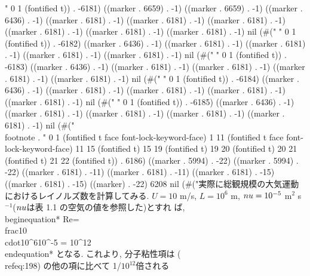 " 0 1 (fontified t)) . -6181) ((marker . 6659) . -1) ((marker . 6659) . -1) ((marker . 6436) . -1) ((marker . 6181) . -1) ((marker . 6181) . -1) ((marker . 6181) . -1) ((marker . 6181) . -1) ((marker . 6181) . -1) ((marker . 6181) . -1) nil (#("	" 0 1 (fontified t)) . -6182) ((marker . 6436) . -1) ((marker . 6181) . -1) ((marker . 6181) . -1) ((marker . 6181) . -1) ((marker . 6181) . -1) nil (#(" " 0 1 (fontified t)) . -6183) ((marker . 6436) . -1) ((marker . 6181) . -1) ((marker . 6181) . -1) ((marker . 6181) . -1) ((marker . 6181) . -1) nil (#(" " 0 1 (fontified t)) . -6184) ((marker . 6436) . -1) ((marker . 6181) . -1) ((marker . 6181) . -1) ((marker . 6181) . -1) ((marker . 6181) . -1) nil (#(" " 0 1 (fontified t)) . -6185) ((marker . 6436) . -1) ((marker . 6181) . -1) ((marker . 6181) . -1) ((marker . 6181) . -1) ((marker . 6181) . -1) nil (#("\\footnote{
	   		  }.
" 0 1 (fontified t face font-lock-keyword-face) 1 11 (fontified t face font-lock-keyword-face) 11 15 (fontified t) 15 19 (fontified t) 19 20 (fontified t) 20 21 (fontified t) 21 22 (fontified t)) . 6186) ((marker . 5994) . -22) ((marker . 5994) . -22) ((marker . 6181) . -11) ((marker . 6181) . -11) ((marker . 6181) . -15) ((marker . 6181) . -15) ((marker) . -22) 6208 nil (#("実際に総観規模の大気運動におけるレイノルズ数を計算してみる.
	   $U=10$ m/s, $L=10^6$ m, $\\nu=10^{-5}$ m$^2$ s$^{-1}$($\\nu$は表 1.1 の空気の値を参照した)とすれ
	   ば,
	   \\begin{equation*}
	Re=\\frac{10\\cdot10^{6}}{10^{-5}} = 10^{12}
	   \\end{equation*}
	   となる. これより, 分子粘性項は (\\ref{eq:198}) の他の項に比べて 1/$10^{12}$倍される
